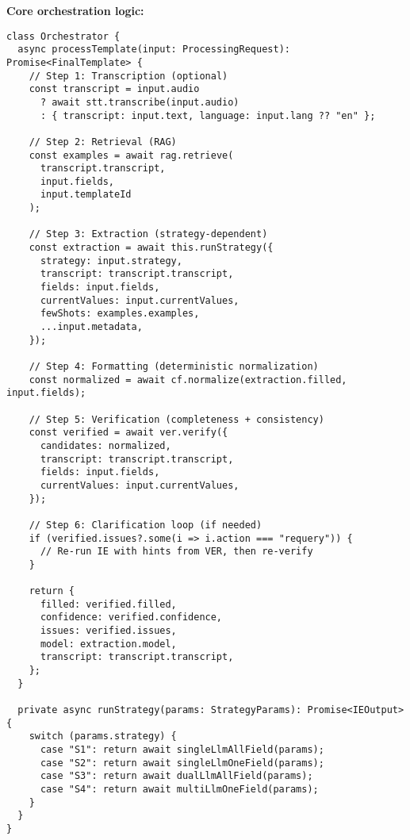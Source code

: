 \textbf{Core orchestration logic:}
\begin{verbatim}
class Orchestrator {
  async processTemplate(input: ProcessingRequest): Promise<FinalTemplate> {
    // Step 1: Transcription (optional)
    const transcript = input.audio 
      ? await stt.transcribe(input.audio)
      : { transcript: input.text, language: input.lang ?? "en" };

    // Step 2: Retrieval (RAG)
    const examples = await rag.retrieve(
      transcript.transcript,
      input.fields,
      input.templateId
    );

    // Step 3: Extraction (strategy-dependent)
    const extraction = await this.runStrategy({
      strategy: input.strategy,
      transcript: transcript.transcript,
      fields: input.fields,
      currentValues: input.currentValues,
      fewShots: examples.examples,
      ...input.metadata,
    });

    // Step 4: Formatting (deterministic normalization)
    const normalized = await cf.normalize(extraction.filled, input.fields);

    // Step 5: Verification (completeness + consistency)
    const verified = await ver.verify({
      candidates: normalized,
      transcript: transcript.transcript,
      fields: input.fields,
      currentValues: input.currentValues,
    });

    // Step 6: Clarification loop (if needed)
    if (verified.issues?.some(i => i.action === "requery")) {
      // Re-run IE with hints from VER, then re-verify
    }

    return {
      filled: verified.filled,
      confidence: verified.confidence,
      issues: verified.issues,
      model: extraction.model,
      transcript: transcript.transcript,
    };
  }

  private async runStrategy(params: StrategyParams): Promise<IEOutput> {
    switch (params.strategy) {
      case "S1": return await singleLlmAllField(params);
      case "S2": return await singleLlmOneField(params);
      case "S3": return await dualLlmAllField(params);
      case "S4": return await multiLlmOneField(params);
    }
  }
}
\end{verbatim}
